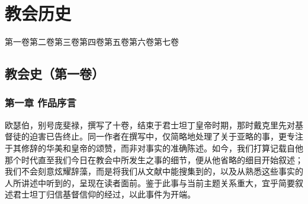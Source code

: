 
\chapter{教会历史}


第一卷\newline{}第二卷\newline{}第三卷\newline{}第四卷\newline{}第五卷\newline{}第六卷\newline{}第七卷\par



\section{教会史（第一卷）}


\subsection{第一章 作品序言}

欧瑟伯，别号庞斐禄，撰写了十卷，结束于君士坦丁皇帝时期，那时戴克里先对基督徒的迫害已告终止。同一作者在撰写中，仅简略地处理了关于亚略的事，更专注于其修辞的华美和皇帝的颂赞，而非对事实的准确陈述。如今，我们打算记载自他那个时代直至我们今日在教会中所发生之事的细节，便从他省略的细目开始叙述；我们不会刻意炫耀辞藻，而是将我们从文献中能搜集到的，以及从熟悉这些事实的人所讲述中听到的，呈现在读者面前。鉴于此事与当前主题关系重大，宜乎简要叙述君士坦丁归信基督信仰的经过，以此事件为开端。\par


